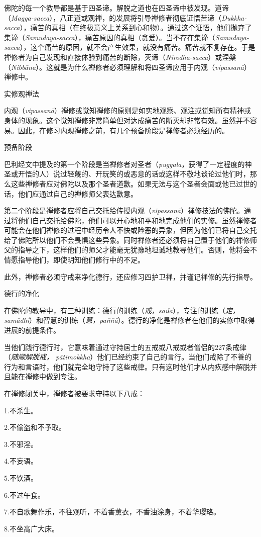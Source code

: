 佛陀的每一个教导都是基于四圣谛。解脱之道也在四圣谛中被发现。道谛（{\it Magga-sacca}），八正道或观禅，的发展将引导禅修者彻底证悟苦谛（{\it Dukkha-sacca}），痛苦的真相（在终极意义上关系到心和物）。通过这个证悟，他们抛弃了集谛（{\it Samudaya-sacca}），痛苦原因的真相（贪爱）。当不存在集谛（{\it Samudaya-sacca}），这个痛苦的原因，就不会产生效果，就没有痛苦。痛苦就不复存在。于是禅修者为自己发现和直接体验到痛苦的断除，灭谛（{\it Nirodha-sacca}）或涅槃（{\it Nibb\=ana}）。这就是为什么禅修者必须理解和将四圣谛应用于内观（{\it vipassan\=a}）禅修中。

\ssubsectnon 实修观禅法

内观（{\it vipassan\=a}）禅修或觉知禅修的原则是如实地观察、观注或觉知所有精神或身体的现象。这个觉知禅修非常简单\1但对达成痛苦的断灭却非常有效。虽然并不容易。因此，在修习内观禅修之前，有几个预备阶段是禅修者必须经历的。

\sssubsectnoni 预备阶段

巴利经文中提及的第一个阶段是当禅修者对圣者（{\it puggala}，获得了一定程度的神圣或开悟的人）说过轻蔑的、开玩笑的或恶意的话或这样不敬地谈论过他们时，那么这些禅修者应对佛陀以及那个圣者道歉。如果无法与这个圣者会面或他已过世的话，他们应通过自己的禅修师父表达歉意。

第二个阶段是禅修者应将自己交托给传授内观（{\it vipassan\=a}）禅修技法的佛陀。通过将他们自己交托给佛陀，他们可以开心地和平和地完成他们的实修。虽然禅修者可能会在他们禅修的过程中经历令人不快或险恶的异象，但因为他们已将自己交托给了佛陀所以他们不会畏惧这些异象。同时禅修者还必须将自己置于他们的禅修师父的指导之下，这样他们的师父才能毫无犹豫地坦诚地教导他们。否则，他将会不情愿指导他们，即使明知他们修行中的不足。

此外，禅修者必须守戒来净化德行，还应修习四护卫禅，并谨记禅修的先行指导。

\ssssubsectnonb 德行的净化

在佛陀的教导中，有三种训练：德行的训练（{\it 戒，s\=a\i la}），专注的训练（{\it 定，sam\=adhi}）和智慧的训练\1（{\it 慧，pa\~n\~n\=a}）。德行的净化是禅修者在他们的实修中取得进展的前提条件。

当他们践行德行时，它意味着通过守持居士的五戒或八戒或者僧侣的227条戒律（{\it 随顺解脱戒， p\=atimokkha}）他们已经约束了自己的言行。当他们戒除了不善的行为和言语时，他们就完全地守持了这些戒律。只有这时他们才从内疚感中解脱并且能在禅修中做到专注。

在禅修闭关中，禅修者被要求守持以下八戒：

{
\leftskip=1.6pc
\item{1.}不杀生。
\item{2.}不偷盗和不予取。
\item{3.}不邪淫。
\item{4.}不妄语。
\item{5.}不饮酒。
\item{6.}不过午食。
\item{7.}不自歌舞作乐，不往观听，不着香薰衣，不香油涂身，不着华璎珞。
\item{8.}不坐高广大床。

}

